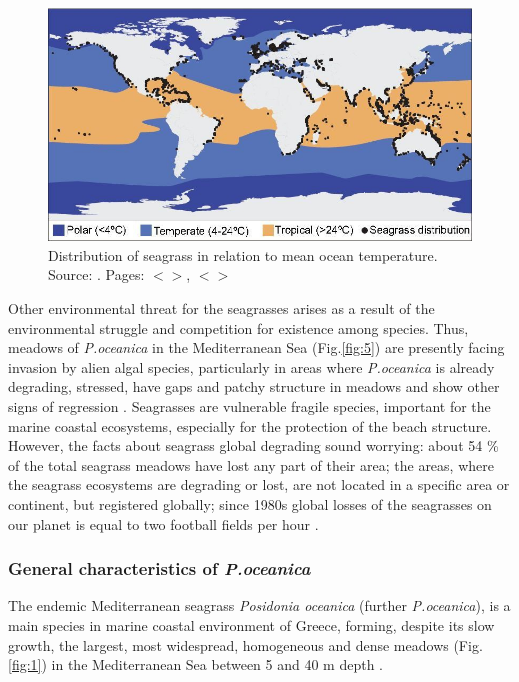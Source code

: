 \documentclass[11pt]{article}
\begin{document}
\begin{figure}
	\centering
	\includegraphics[scale=0.25]{Fig-1-4.jpg}
	\caption{Distribution of seagrass in relation to mean ocean temperature. 	Source: \cite{Orth06}\label{Orth06}. Pages: $<$\pageref{page-2}$>$, $<$\pageref{page-4}$>$}
	\label{Fig.4}
\end{figure}

Other environmental threat for the seagrasses arises as a result of the environmental struggle and
competition for existence among species. Thus, meadows of \textit{P.oceanica} in the Mediterranean Sea (Fig.\ref{fig:5})\label{page-4} are
presently facing invasion by alien algal species, particularly in areas where \textit{P.oceanica} is already
degrading, stressed, have gaps and patchy structure in meadows and show other signs of regression
\cite{Montefalcone10}\label{Montefalcone10}.
Seagrasses are vulnerable fragile species, important for the marine coastal ecosystems, especially for
the protection of the beach structure. However, the facts about seagrass global degrading sound
worrying: about 54 \% of the total seagrass meadows have lost any part of their area; the areas, where
the seagrass ecosystems are degrading or lost, are not located in a specific area or continent, but
registered globally; since 1980s global losses of the seagrasses on our planet is equal to two football
fields per hour \cite{Mellors09b}\label{Mellors09b}.
\pagebreak

\subsubsection{General characteristics of \textit{P.oceanica}}
The endemic Mediterranean seagrass \textit{Posidonia oceanica} (further \textit{P.oceanica}), is a main species in
marine coastal environment of Greece, forming, despite its slow growth, the largest, most widespread,
homogeneous and dense meadows (Fig.\ref{fig:1}) in the Mediterranean Sea between 5 and 40 m depth \cite{DenHartog70}\label{DenHartog70}.
\end{document}
